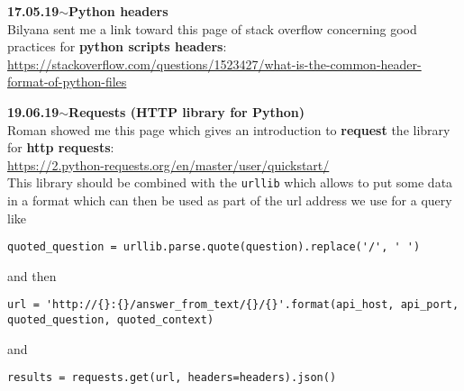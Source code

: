 \documentclass[11pt,a4paper]{article}
\newenvironment{loggentry}[2]%
{\noindent\textbf{#1}\hspace{1cm}$\mathbf{\sim}$\text{ }\textbf{#2}\\}{\vspace{0.5cm}}
\begin{document}
\begin{loggentry}{17.05.19}{Python headers}

Bilyana sent me a link toward this page of stack overflow concerning good practices for \textbf{python scripts headers}:\\
\url{https://stackoverflow.com/questions/1523427/what-is-the-common-header-format-of-python-files}

\end{loggentry}


\begin{loggentry}{19.06.19}{Requests (HTTP library for Python)}

Roman showed me this page which gives an introduction to \textbf{request} the library for \textbf{http requests}:\\
\url{https://2.python-requests.org/en/master/user/quickstart/}\\
This library should be combined with the \texttt{urllib} which allows to put some data in a format which can then be used as part of the url address we use for a query like
\begin{verbatim}
quoted_question = urllib.parse.quote(question).replace('/', ' ')
\end{verbatim}
and then
\begin{verbatim}
url = 'http://{}:{}/answer_from_text/{}/{}'.format(api_host, api_port, quoted_question, quoted_context)
\end{verbatim}
and
\begin{verbatim}
results = requests.get(url, headers=headers).json()
\end{verbatim}

\end{loggentry}
\end{document}
